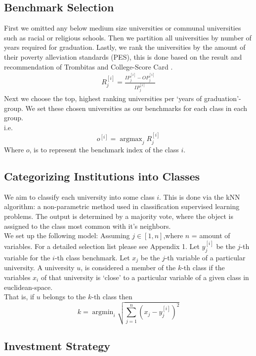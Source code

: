 \documentclass[12pt]{scrartcl}
\newcommand{\argmax}{\mathop{\mathrm{argmax}}}
\newcommand{\argmin}{\mathop{\mathrm{argmin}}}
\begin{document}
	\subsection{Benchmark Selection}
		First we omitted any below medium size universities or communal universities such as racial or religious schools. Then we partition all universities by number of years required for graduation. Lastly, we rank the universities by the amount of their poverty alleviation standards (PES), this is done based on the result and recommendation of Trombitas \cite{Trom} and College-Score Card \cite{US}.\\ 
		\begin{align}
			R_j^{[i]}=\frac{IP_j^{[i]}-OP_j^{[i]}}{IP_j^{[i]}}
		\end{align}
		Next we choose the top, highest ranking universities per `years of graduation'-group. We set these chosen universities as our benchmarks for each class in each group.\\
		i.e.
		$$
			o^{[i]} = \argmax_{j} R_j^{[i]}
		$$
		Where $o$, is to represent the benchmark index of the class $i$.

	\subsection{Categorizing Institutions into Classes}
		We aim to classify each university into some class $i$. This is done via the kNN algorithm: a non-parametric method used in classification supervised learning problems. The output is determined by a majority vote, where the object is assigned to the class most common with it's neighbors. \cite{Hastie}\\
		We set up the following model:
		Assuming $j\in [1,n]$,where $n$ = amount of variables. For a detailed selection list please see Appendix 1. Let $y_j^{[i]}$ be the $j$-th variable for the $i$-th class benchmark. Let $x_j$ be the $j$-th variable of a particular university. A university $u$, is considered a member of the $k$-th class if the variables $x_i$ of that university is `close' to a particular variable of a given class in euclidean-space.\\
	
		That is, if $u$ belongs to the $k$-th class then
		$$
			k = \argmin_{i} \sqrt{ \sum_{j=1}^n (x_j-y_j^{[i]})^2 }
		$$

	
	\subsection{Investment Strategy}
\end{document}
